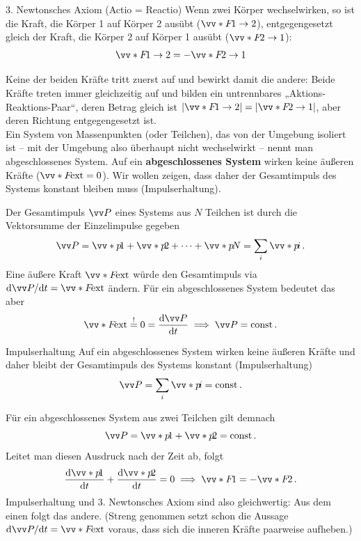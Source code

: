 \begin{importantbox}[]{3. Newtonsches Axiom (Actio = Reactio)}
    Wenn zwei Körper wechselwirken, so ist die Kraft, die Körper 1 auf Körper 2 ausübt ($\ivecS{F}{1\rightarrow 2}$), entgegengesetzt gleich der Kraft, die Körper 2 auf Körper 1 ausübt ($\ivecS{F}{2\rightarrow 1}$):
    \begin{equation}\label{eq: drittes_axiom_actio_reactio}
        \ivecS{F}{1\rightarrow 2} = -\ivecS{F}{2\rightarrow 1} 
    \end{equation}
\end{importantbox}
Keine der beiden Kräfte tritt zuerst auf und bewirkt damit die andere: Beide Kräfte treten immer gleichzeitig auf und bilden ein untrennbares „Aktions-Reaktions-Paar“, deren Betrag gleich ist $|\ivecS{F}{1\rightarrow 2}| = |\ivecS{F}{2\rightarrow 1}|$, aber deren Richtung entgegengesetzt ist. \\

Ein System von Massenpunkten (oder Teilchen), das von der Umgebung isoliert ist -- mit der Umgebung also überhaupt nicht wechselwirkt -- nennt man abgeschlossenes System. Auf ein \textbf{abgeschlossenes System} wirken keine äußeren Kräfte ($\ivecS{F}{\mathrm{ext}} = 0$). Wir wollen zeigen, dass daher der Gesamtimpuls des Systems konstant bleiben muss (Impulserhaltung). 

Der Gesamtimpuls $\ivec{P}$ eines Systems aus $N$ Teilchen ist durch die Vektorsumme der Einzelimpulse gegeben
\begin{equation}
    \ivec{P} = \ivecS{p}{1} + \ivecS{p}{2} + \cdots + \ivecS{p}{N} = \sum_i \ivecS{p}{i} \mDot
\end{equation}
Eine äußere Kraft $\ivecS{F}{\mathrm{ext}}$ würde den Gesamtimpuls via $\dd \ivec{P}/\dd t = \ivecS{F}{\mathrm{ext}}$ ändern. Für ein abgeschlossenes System bedeutet das aber
\begin{equation}
    \ivecS{F}{\mathrm{ext}} \eqexcl 0 = \frac{\dd \ivec{P}}{\dd t} \implies \ivec{P} = \const \mDot
\end{equation}
\begin{rememberbox}{Impulserhaltung}
    Auf ein abgeschlossenes System wirken keine äußeren Kräfte und daher bleibt der Gesamtimpuls des Systems konstant (Impulserhaltung)
    \begin{equation}
        \ivec{P} = \sum_{i} \ivecS{p}{i} = \const \mDot
    \end{equation}
\end{rememberbox}
Für ein abgeschlossenes System aus zwei Teilchen gilt demnach 
\begin{equation*}
    \ivec{P} = \ivecS{p}{1} + \ivecS{p}{2} = \const \mDot
\end{equation*}
Leitet man diesen Ausdruck nach der Zeit ab, folgt 
\begin{equation*}
    \frac{\dd \ivecS{p}{1}}{\dd t} + \frac{\dd \ivecS{p}{2}}{\dd t} = 0 \implies \ivecS{F}{1} = -\ivecS{F}{2} \mDot
\end{equation*}
Impulserhaltung und 3. Newtonsches Axiom sind also gleichwertig: Aus dem einen folgt das andere. (Streng genommen setzt schon die Aussage $\dd\ivec{P}/\dd t = \ivecS{F}{\mathrm{ext}}$ voraus, dass sich die inneren Kräfte paarweise aufheben.)


